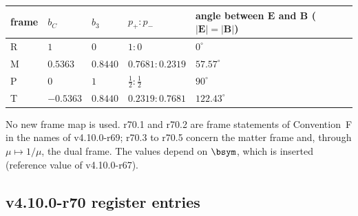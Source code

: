 \begin{center}
\small
\begin{tabular}{@{}>{\raggedright\arraybackslash}p{}>{\raggedright\arraybackslash}p{}>{\raggedright\arraybackslash}p{}>{\raggedright\arraybackslash}p{}>{\raggedright\arraybackslash}p{}@{}}
\toprule
frame & \(b_C\) & \(b_3\) & \(p_+:p_-\) & angle between \(\mathbf E\) and \(\mathbf B\) (\(|\mathbf E|=|\mathbf B|\))\\
\midrule
R & \(1\) & \(0\) & \(1:0\) & \(0^\circ\)\\
M & \(0.5363\) & \(0.8440\) & \(0.7681:0.2319\) & \(57.57^\circ\)\\
P & \(0\) & \(1\) & \(\tfrac12:\tfrac12\) & \(90^\circ\)\\
T & \(-0.5363\) & \(0.8440\) & \(0.2319:0.7681\) & \(122.43^\circ\)\\
\bottomrule
\end{tabular}
\end{center}
No new frame map is used.  r70.1 and r70.2 are frame statements of Convention~F in the names of v4.10.0-r69; r70.3 to r70.5 concern the matter
frame and, through \(\mu\mapsto1/\mu\), the dual frame.  The values depend on \(\bsym\), which is inserted (reference value of v4.10.0-r67).

\subsection*{v4.10.0-r70 register entries}
\label{subsec:v4100-r70-register}

